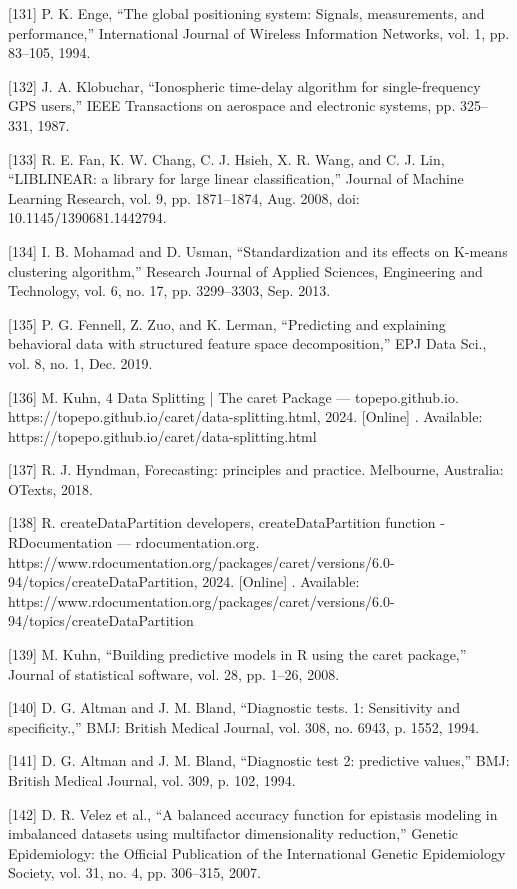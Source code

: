 \documentclass[sn-mathphys-num]{sn-jnl}%
\begin{document}
[131] P. K. Enge, “The global positioning system: Signals, measurements, and performance,” International Journal of Wireless Information Networks, vol. 1, pp. 83–105, 1994.

[132] J. A. Klobuchar, “Ionospheric time-delay algorithm for single-frequency GPS users,” IEEE Transactions on aerospace and electronic systems, pp. 325–331, 1987.

[133] R. E. Fan, K. W. Chang, C. J. Hsieh, X. R. Wang, and C. J. Lin, “LIBLINEAR: a library for large linear classification,” Journal of Machine Learning Research, vol. 9, pp. 1871–1874, Aug. 2008, doi: 10.1145/1390681.1442794.

[134] I. B. Mohamad and D. Usman, “Standardization and its effects on K-means clustering algorithm,” Research Journal of Applied Sciences, Engineering and Technology, vol. 6, no. 17, pp. 3299–3303, Sep. 2013.

[135] P. G. Fennell, Z. Zuo, and K. Lerman, “Predicting and explaining behavioral data with structured feature space decomposition,” EPJ Data Sci., vol. 8, no. 1, Dec. 2019.

[136] M. Kuhn, 4 Data Splitting | The caret Package — topepo.github.io. https://topepo.github.io/caret/data-splitting.html, 2024. [Online] . Available: https://topepo.github.io/caret/data-splitting.html

[137] R. J. Hyndman, Forecasting: principles and practice. Melbourne, Australia: OTexts, 2018.

[138] R. createDataPartition developers, createDataPartition function - RDocumentation — rdocumentation.org. https://www.rdocumentation.org/packages/caret/versions/6.0-94/topics/createDataPartition, 2024. [Online] . Available: https://www.rdocumentation.org/packages/caret/versions/6.0-94/topics/createDataPartition

[139] M. Kuhn, “Building predictive models in R using the caret package,” Journal of statistical software, vol. 28, pp. 1–26, 2008.

[140] D. G. Altman and J. M. Bland, “Diagnostic tests. 1: Sensitivity and specificity.,” BMJ: British Medical Journal, vol. 308, no. 6943, p. 1552, 1994.

[141] D. G. Altman and J. M. Bland, “Diagnostic test 2: predictive values,” BMJ: British Medical Journal, vol. 309, p. 102, 1994.

[142] D. R. Velez et al., “A balanced accuracy function for epistasis modeling in imbalanced datasets using multifactor dimensionality reduction,” Genetic Epidemiology: the Official Publication of the International Genetic Epidemiology Society, vol. 31, no. 4, pp. 306–315, 2007.
\end{document}
